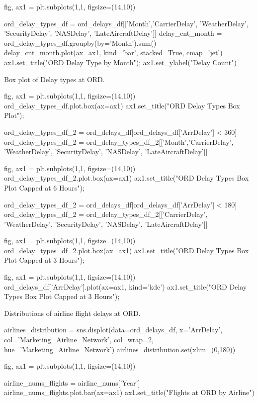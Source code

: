 \documentclass[a4paper,12pt]{article}
\begin{document}
\begin{python}

fig, ax1 = plt.subplots(1,1, figsize=(14,10))

ord_delay_types_df = ord_delays_df[['Month','CarrierDelay', 'WeatherDelay', 'SecurityDelay', 'NASDelay', 'LateAircraftDelay']]
delay_cnt_month = ord_delay_types_df.groupby(by='Month').sum()
delay_cnt_month.plot(ax=ax1, kind='bar', stacked=True, cmap='jet')
ax1.set_title("ORD Delay Type by Month");
ax1.set_ylabel("Delay Count")

\end{python}

Box plot of Delay types at ORD.

\begin{python}

fig, ax1 = plt.subplots(1,1, figsize=(14,10))
ord_delay_types_df.plot.box(ax=ax1)
ax1.set_title("ORD Delay Types Box Plot");

ord_delay_types_df_2 = ord_delays_df[ord_delays_df['ArrDelay'] < 360] 
ord_delay_types_df_2 = ord_delay_types_df_2[['Month','CarrierDelay', 'WeatherDelay', 'SecurityDelay', 'NASDelay', 'LateAircraftDelay']]

fig, ax1 = plt.subplots(1,1, figsize=(14,10))
ord_delay_types_df_2.plot.box(ax=ax1)
ax1.set_title("ORD Delay Types Box Plot Capped at 6 Hours");

ord_delay_types_df_2 = ord_delays_df[ord_delays_df['ArrDelay'] < 180] 
ord_delay_types_df_2 = ord_delay_types_df_2[['CarrierDelay', 'WeatherDelay', 'SecurityDelay', 'NASDelay', 'LateAircraftDelay']]

fig, ax1 = plt.subplots(1,1, figsize=(14,10))
ord_delay_types_df_2.plot.box(ax=ax1)
ax1.set_title("ORD Delay Types Box Plot Capped at 3 Hours");

fig, ax1 = plt.subplots(1,1, figsize=(14,10))
ord_delays_df['ArrDelay'].plot(ax=ax1, kind='kde')
ax1.set_title("ORD Delay Types Box Plot Capped at 3 Hours");


\end{python}

Distributions of airline flight delays at ORD.

\begin{python}
airlines_distribution = sns.displot(data=ord_delays_df, x='ArrDelay', col='Marketing_Airline_Network', col_wrap=2, hue='Marketing_Airline_Network')
airlines_distribution.set(xlim=(0,180))

fig, ax1 = plt.subplots(1,1, figsize=(14,10))

airline_nums_flights = airline_nums['Year']
airline_nums_flights.plot.bar(ax=ax1)
ax1.set_title("Flights at ORD by Airline")

\end{python}
\end{document}
